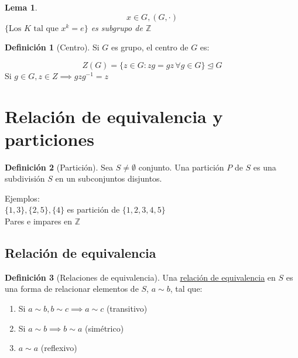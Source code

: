 \documentclass[11pt]{book}
\newtheorem{lem}[thm]{Lema}
\theoremstyle{definition}
\newtheorem{defn}{Definición}[section]
\begin{document}
\begin{lem}
	\[x\in G, (G,\cdot)\]
	$\{\textrm{Los $K$ tal que $x^k=e$}\}$ es subgrupo de $\mathbb{Z}$
	
\end{lem}

\begin{defn}[Centro]
	Si $G$ es grupo, el centro de $G$ es:
\end{defn}
\[
Z(G)=\{z\in G: zg=gz\,\forall g\in G\}\trianglelefteq G
\]
Si $g\in G,z\in Z\implies gzg^{-1}=z$
\section{Relación de equivalencia y particiones}
\begin{defn}[Partición]
	Sea $S\neq\emptyset$ conjunto. Una partición $P$ de $S$ es una subdivisión $S$ en un subconjuntos disjuntos.\\
\end{defn}
Ejemplos:\\
$\{1,3\},\{2,5\},\{4\}$ es partición de $\{1,2,3,4,5\}$\\
Pares e impares en $\mathbb{Z}$\\
\subsection{Relación de equivalencia}
\begin{defn}[Relaciones de equivalencia]
	Una \underline{relación de equivalencia} en $S$ es una forma de relacionar elementos de $S$, $a\sim b$, tal que:
	\begin{enumerate}[label=(\arabic*)]
		\item Si $a\sim b,b\sim c\implies a\sim c$ (transitivo)
		
		\item Si $a\sim b\implies b\sim a$ (simétrico)
		
		\item $a\sim a$ (reflexivo)
	\end{enumerate}
\end{defn}
\end{document}
